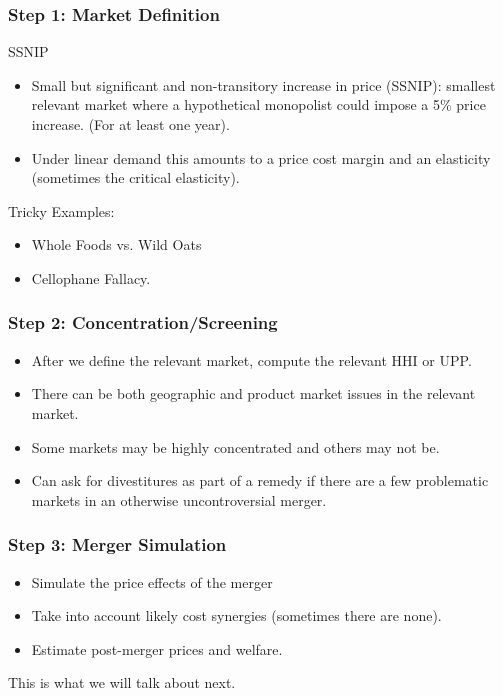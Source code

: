 \begin{frame}
\frametitle{Step 1: Market Definition}
SSNIP
 \begin{itemize}
\item Small but significant and non-transitory increase in price (SSNIP): smallest relevant market where a hypothetical monopolist could impose a 5\% price increase. (For at least one year).
\item Under linear demand this amounts to a price cost margin and an elasticity (sometimes the \alert{critical elasticity}).
 \end{itemize}
 Tricky Examples:
  \begin{itemize}
\item Whole Foods vs. Wild Oats
\item Cellophane Fallacy.
 \end{itemize}
\end{frame}

\begin{frame}
\frametitle{Step 2: Concentration/Screening}
 \begin{itemize}
\item After we define the relevant market, compute the relevant HHI or UPP.
\item There can be both geographic and product market issues in the relevant market.
\item Some markets may be highly concentrated and others may not be.
\item Can ask for \alert{divestitures} as part of a \alert{remedy} if there are a few problematic markets in an otherwise uncontroversial merger.
 \end{itemize}
\end{frame}


\begin{frame}
\frametitle{Step 3: Merger Simulation}
 \begin{itemize}
\item Simulate the price effects of the merger
\item Take into account likely cost synergies (sometimes there are none).
\item Estimate post-merger prices and welfare.
 \end{itemize}
 This is what we will talk about next.
\end{frame}













